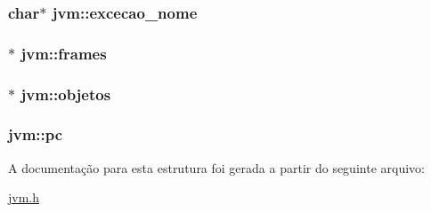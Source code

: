 \subsubsection[{\texorpdfstring{excecao\+\_\+nome}{excecao_nome}}]{\setlength{\rightskip}{0pt plus 5cm}char$\ast$ jvm\+::excecao\+\_\+nome}\hypertarget{structjvm_a471ac752db9424623227c661b194399b}{}\label{structjvm_a471ac752db9424623227c661b194399b}
\subsubsection[{\texorpdfstring{frames}{frames}}]{$\ast$ jvm\+::frames}\hypertarget{structjvm_a4277814c8cb94f0e77f09428d3d668b9}{}\label{structjvm_a4277814c8cb94f0e77f09428d3d668b9}
\subsubsection[{\texorpdfstring{objetos}{objetos}}]{$\ast$ jvm\+::objetos}\hypertarget{structjvm_a4a51ef7b7c771d7f86a22b4d869ac430}{}\label{structjvm_a4a51ef7b7c771d7f86a22b4d869ac430}
\subsubsection[{\texorpdfstring{pc}{pc}}]{ jvm\+::pc}\hypertarget{structjvm_ac879eb42576afb2256646f478a7f68c2}{}\label{structjvm_ac879eb42576afb2256646f478a7f68c2}


A documentação para esta estrutura foi gerada a partir do seguinte arquivo\+:\begin{DoxyCompactItemize}
\item 
\hyperlink{jvm_8h}{jvm.\+h}\end{DoxyCompactItemize}
